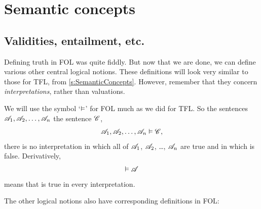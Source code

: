 \chapter{Semantic concepts}

\section{Validities, entailment, etc.}

Defining truth in FOL was quite fiddly. But now that we are done, we can define various other central logical notions. These definitions will look very similar to those for TFL, from \cref{s:SemanticConcepts}. However, remember that they concern \emph{interpretations}, rather than valuations.

We will use the symbol `$\vDash$' for FOL much as we did for TFL. So
the sentences $\mathscr{A}_1, \mathscr{A}_2, \ldots, \mathscr{A}_n$
 the sentence $\mathscr{C}$,
	$$\mathscr{A}_1, \mathscr{A}_2, \ldots, \mathscr{A}_n \vDash\mathscr{C},$$
\ifeff{} there is no interpretation in which all of $\mathscr{A}_1$, $\mathscr{A}_2$, \dots, $\mathscr{A}_n$ are true and in which  is false. Derivatively,
	$$\vDash\mathscr{A}$$
means that  is true in every interpretation.

The other logical notions also have corresponding definitions in FOL:

